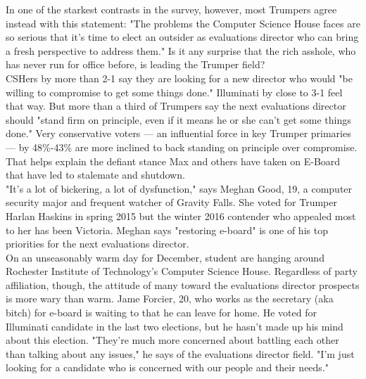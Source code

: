 \documentclass[9pt]{extarticle} %
\begin{document}
In one of the starkest contrasts in the survey, however, most Trumpers agree instead with this statement: "The problems the Computer Science House faces are so serious that it's time to elect an outsider as evaluations director who can bring a fresh perspective to address them." Is it any surprise that the rich asshole, who has never run for office before, is leading the Trumper field? \\

CSHers by more than 2-1 say they are looking for a new director who would "be willing to compromise to get some things done." Illuminati by close to 3-1 feel that way. But more than a third of Trumpers say the next evaluations director should "stand firm on principle, even if it means he or she can't get some things done." Very conservative voters — an influential force in key Trumper primaries — by 48\%-43\% are more inclined to back standing on principle over compromise. That helps explain the defiant stance Max and others have taken on E-Board that have led to stalemate and shutdown. \\

"It's a lot of bickering, a lot of dysfunction," says Meghan Good, 19, a computer security major and frequent watcher of Gravity Falls. She voted for Trumper Harlan Haskins in spring 2015 but the winter 2016 contender who appealed most to her has been Victoria. Meghan says "restoring e-board" is one of his top priorities for the next evaluations director. \\

On an unseasonably warm day for December, student are hanging around Rochester Institute of Technology's Computer Science House. Regardless of party affiliation, though, the attitude of many toward the evaluations director prospects is more wary than warm. Jame Forcier, 20, who works as the secretary (aka bitch) for e-board is waiting to that he can leave for home. He voted for Illuminati candidate in the last two elections, but he hasn't made up his mind about this election. "They're much more concerned about battling each other than talking about any issues," he says of the evaluations director field. "I'm just looking for a candidate who is concerned with our people and their needs."
\end{document}
